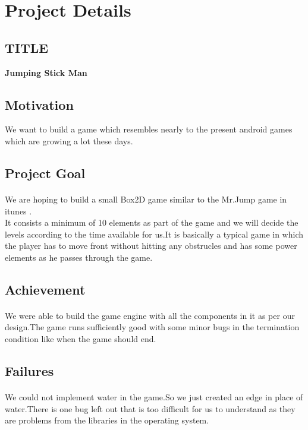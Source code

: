 \documentclass{article}
\begin{document}
\newpage
\section{Project Details}

\subsection{TITLE}
{\bf Jumping Stick Man}\\

\subsection{Motivation}
We want to build a game which resembles nearly to the present android games which are growing a lot these days.

\subsection{Project Goal}
\paragraph{}
 We are hoping to build a small Box2D game similar to the Mr.Jump game in itunes \cite{WinNT}.\\It consists a minimum of 10 elements as part of the game and we will decide the levels according to the time available for us.It is basically a typical game in which the player has to move front without hitting any obstrucles and has some power elements as he passes through the game.

\subsection{Achievement}
\paragraph{}
 We were able to build the game engine with all the components in it as per our design.The game runs sufficiently good with some minor bugs in the termination condition like when the game should end.

\subsection{Failures}
\paragraph{}
 We could not implement water in the game.So we just created an edge in place of water.There is one bug left out that is too difficult for us to understand as they are problems from the libraries in the operating system.
\end{document}
